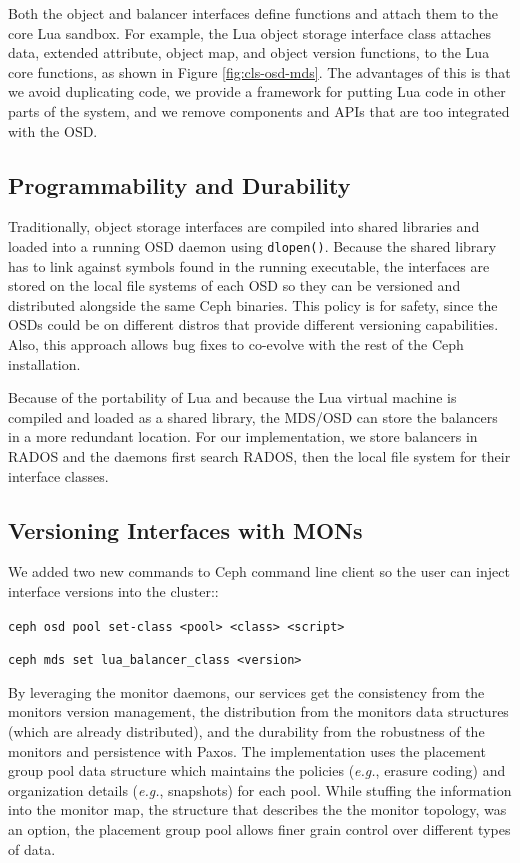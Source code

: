 \documentclass[10pt,twocolumn]{article}
\begin{document}
\iffalse
Both the object and balancer interfaces define functions and attach them
to the core Lua sandbox. For example, the Lua object storage interface
class attaches data, extended attribute, object map, and object version
functions, to the Lua core functions, as shown in Figure
\ref{fig:cls-osd-mds}. The advantages of this is that we avoid
duplicating code, we provide a framework for putting Lua code in other
parts of the system, and we remove components and APIs that are too
integrated with the OSD.

\subsection{Programmability and Durability}

Traditionally, object storage interfaces are compiled into shared
libraries and loaded into a running OSD daemon using \texttt{dlopen()}.
Because the shared library has to link against symbols found in the
running executable, the interfaces are stored on the local file systems
of each OSD so they can be versioned and distributed alongside the same
Ceph binaries. This policy is for safety, since the OSDs could be on
different distros that provide different versioning capabilities. Also,
this approach allows bug fixes to co-evolve with the rest of the Ceph
installation.

Because of the portability of Lua and because the Lua virtual machine is
compiled and loaded as a shared library, the MDS/OSD can store the
balancers in a more redundant location. For our implementation, we store
balancers in RADOS and the daemons first search RADOS, then the local
file system for their interface classes.

\subsection{Versioning Interfaces with
MONs}\label{versioning-interfaces-with-mons}

We added two new commands to Ceph command line client so the user can
inject interface versions into the cluster::

\noindent \texttt{ceph\ osd\ pool\ set-class\ \textless{}pool\textgreater{}\ \textless{}class\textgreater{}\ \textless{}script\textgreater{}}

\noindent \texttt{ceph\ mds\ set\ lua\_balancer\_class\ \textless{}version\textgreater{}}

By leveraging the monitor daemons, our services get the consistency from
the monitors version management, the distribution from the monitors data
structures (which are already distributed), and the durability from the
robustness of the monitors and persistence with Paxos. The
implementation uses the placement group pool data structure which
maintains the policies (\emph{e.g.}, erasure coding) and organization
details (\emph{e.g.}, snapshots) for each pool. While stuffing the
information into the monitor map, the structure that describes the the
monitor topology, was an option, the placement group pool allows finer
grain control over different types of data.
\end{document}
